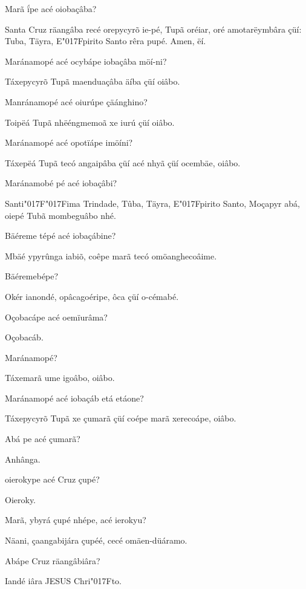 \documentclass[openany,titlepage,12pt]{book}
\newcommand{\lgS}{\char"017F}
\newcommand{\lgSS}{\char"017F\char"017F}
\begin{document}
\begin{alternate}
    \item Marã ḯpe acé oiobaçâba?
    \item Santa Cruz räangâba recé orepycyrõ ie-pé,
    Tupã oréiar, oré amotarëymbâra\linebreak
    çüí: Tuba, Täyra, E\lgS pirito Santo rêra\linebreak
    pupé. Amen, ëí.
    \item Maránamopé acé ocybápe iobaçâba möí-ni?
    \item Táxepycyrõ Tupã maenduaçâba äíba çüí oiâbo.
    \item Manránamopé acé oiurúpe çäánghino?
    \item Toipëá Tupã nhëéngmemoã xe iurú çüí oiâbo.
    \item Maránamopé acé opotïápe imöíni?
    \item Táxepëá Tupã tecó angaipâba çüí acé\linebreak
    nhyã çüí ocembäe, oiâbo.
    \item Maránamobé pé acé iobaçâbi?
    \item Santi\lgSS ima Trindade, Tûba, Täyra, E\lgS pirito
    Santo, Moçapyr abá, oiepé Tubã mombeguâbo nhé.
    \item Bäéreme tépé acé iobaçábine?
    \item Mbäé ypyrûnga iabiõ, coêpe marã tecó omöanghecoâime.
    \item Bäéremebépe?
    \item Okér ianondé, opâcagoéripe, ôca çüí o-cémabé.
    \item Oçobacápe acé oemïurâma?
    \item Oçobacáb.
    \item Maránamopé?
    \item Táxemarã ume igoâbo, oiâbo.
    \item Maránamopé acé iobaçáb etá etáone?
    \item Táxepycyrõ Tupã xe çumarã çüí coépe marã xerecoápe, oiâbo.
    \item Abá pe acé çumarã?
    \item Anhânga.
    \item oierokype acé Cruz çupé?
    \item Oieroky.
    \item Marã, ybyrá çupé nhépe, acé ierokyu?
    \item Näani, çaangabijára çupéé, cecé omäen-düáramo.
    \item Abápe Cruz räangâbiâra?
    \item Iandé iâra JESUS Chri\lgS to.

\end{alternate}
\end{document}
